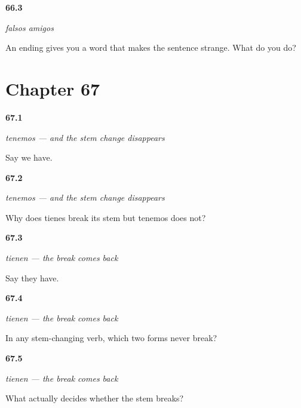 \noindent\begin{minipage}[t]{\linewidth}
\raggedright
\hypertarget{review-ES-C09-falsos-amigos-method}{\textbf{66.3}} \emph{falsos amigos}\par
\small An ending gives you a word that makes the sentence strange. What do you do?
\end{minipage}\par\medskip

\section*{Chapter 67}

\noindent\begin{minipage}[t]{\linewidth}
\raggedright
\hypertarget{review-ES-C08-tenemos-form}{\textbf{67.1}} \emph{tenemos — and the stem change disappears}\par
\small Say we have.
\end{minipage}\par\medskip

\noindent\begin{minipage}[t]{\linewidth}
\raggedright
\hypertarget{review-ES-C08-tenemos-why}{\textbf{67.2}} \emph{tenemos — and the stem change disappears}\par
\small Why does tienes break its stem but tenemos does not?
\end{minipage}\par\medskip

\noindent\begin{minipage}[t]{\linewidth}
\raggedright
\hypertarget{review-ES-C08-tienen-form}{\textbf{67.3}} \emph{tienen — the break comes back}\par
\small Say they have.
\end{minipage}\par\medskip

\noindent\begin{minipage}[t]{\linewidth}
\raggedright
\hypertarget{review-ES-C08-tienen-rule}{\textbf{67.4}} \emph{tienen — the break comes back}\par
\small In any stem-changing verb, which two forms never break?
\end{minipage}\par\medskip

\noindent\begin{minipage}[t]{\linewidth}
\raggedright
\hypertarget{review-ES-C08-tienen-boot}{\textbf{67.5}} \emph{tienen — the break comes back}\par
\small What actually decides whether the stem breaks?
\end{minipage}\par\medskip

